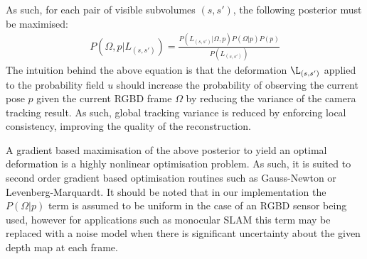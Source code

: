 As such, for each pair of visible subvolumes $(s, s')$, the following posterior must be maximised:
\begin{equation}
\begin{split}
P(\Omega, p | L_{(s, s')}) = \frac{P(L_{(s, s')} | \Omega, p) P(\Omega | p)P(p)}
{P(L_{(s, s')})}
\end{split}
\end{equation}
The intuition behind the above equation is that the deformation $\L_{(s, s')}$ applied to the probability field $u$ should 
increase the probability of observing the current pose $p$ given the current RGBD frame $\Omega$ by reducing the 
variance of the camera tracking result. As such, global tracking variance is reduced by enforcing local consistency, improving the quality 
of the reconstruction.

A gradient based maximisation of the above posterior to yield an optimal deformation is a highly nonlinear optimisation problem. As such, it is suited 
to second order gradient based optimisation routines such as Gauss-Newton or Levenberg-Marquardt.
It should be noted that in our implementation the $P(\Omega | p)$ term is assumed to be uniform in the case of an 
RGBD sensor being used, however for applications such as monocular SLAM this term may be replaced with a noise model when there is 
significant uncertainty about the given depth map at each frame.


